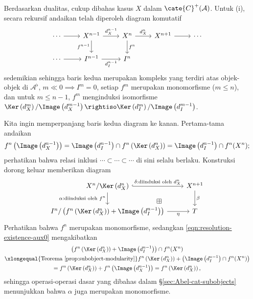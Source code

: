 \begin{bukti}
	Berdasarkan dualitas, cukup dibahas kasus $X$ dalam $\cate{C}^+(\mathcal{A})$. Untuk (i), secara rekursif andaikan telah diperoleh diagram komutatif
	\[\begin{tikzcd}
		\cdots \arrow[r] & X^{n-1} \arrow[r, "{d_X^{n-1}}"] \arrow[d, "{f^{n-1}}"'] & X^n \arrow[r, "{d_X^n}"] \arrow[d, "{f^n}"] & X^{n+1} \arrow[r] & \cdots \\
		\cdots \arrow[r] & I^{n-1} \arrow[r, "{d_I^{n-1}}"'] & I^n & &
	\end{tikzcd}\]
	sedemikian sehingga baris kedua merupakan kompleks yang terdiri atas objek-objek di $\mathcal{A}^\flat$, $m \ll 0 \implies I^m = 0$, setiap $f^m$ merupakan monomorfisme ($m \leq n$), dan untuk $m \leq n-1$, $f^m$ menginduksi isomorfisme $\Ker\left( d_X^m \right) / \Image\left( d_X^{m-1} \right) \rightiso \Ker\left( d_I^m \right) / \Image\left( d_I^{m-1} \right)$.

	Kita ingin memperpanjang baris kedua diagram ke kanan. Pertama-tama andaikan
	\begin{equation}\label{eqn:resolution-existence-aux0}
		f^n\left( \Image\left(d_X^{n-1} \right) \right) = \Image\left( d^{n-1}_I \right) \cap f^n\left( \Ker\left( d_X^n \right) \right) = \Image\left( d^{n-1}_I \right) \cap f^n(X^n) ;
	\end{equation}
	perhatikan bahwa relasi inklusi $\cdots \subset \cdots \subset \cdots$ di sini selalu berlaku. Konstruksi dorong keluar memberikan diagram
	\begin{equation*}\begin{tikzcd}
		X^n / \Ker\left( d_X^n \right) \arrow[hookrightarrow, r, "\delta: \text{diinduksi oleh $d_X^n$}"] \arrow[d, "\alpha: \text{diinduksi oleh $f^n$}"'] & X^{n+1} \arrow[d, "\beta"] \\
		I^n / \left( f^n \left( \Ker\left( d_X^n \right) \right) + \Image\left( d_I^{n-1}\right) \right) \arrow[r, "\eta"'] & T \arrow[phantom, lu, "\boxplus" description]
	\end{tikzcd}\end{equation*}
	Perhatikan bahwa $f^n$ merupakan monomorfisme, sedangkan \eqref{eqn:resolution-existence-aux0} mengakibatkan
	\begin{multline*}
		\left( f^n\left( \Ker\left( d_X^n \right) \right) + \Image\left( d_I^{n-1}\right) \right) \cap f^n(X^n) \\
		\xlongequal{\text{Teorema \ref{prop:subobject-modularity}}} f^n\left( \Ker\left( d_X^n \right) \right) + \left( \Image\left( d_I^{n-1}\right) \cap f^n(X^n) \right) \\
		= f^n\left( \Ker\left( d_X^n \right) \right) + f^n\left(\Image\left(d_X^{n-1} \right) \right) = f^n\left( \Ker\left( d_X^n \right) \right),
	\end{multline*}
	sehingga operasi-operasi dasar yang dibahas dalam \S\ref{sec:Abel-cat-subobjects} menunjukkan bahwa $\alpha$ juga merupakan monomorfisme.
	

\end{bukti}
